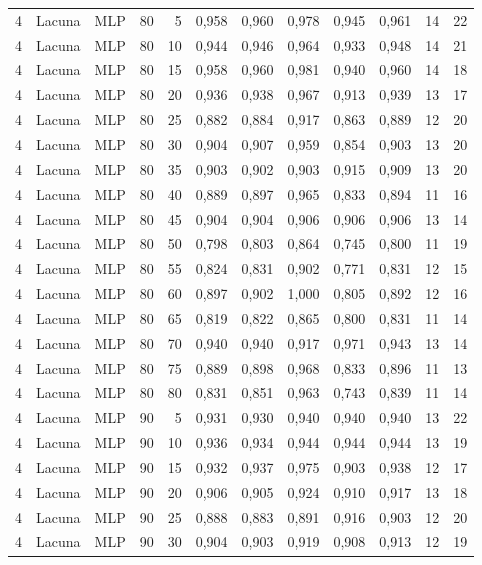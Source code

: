 \begin{longtable}{@{}rllrrrrrrrrr@{}}
4 & Lacuna & MLP & 80 & 5 & 0,958 & 0,960 & 0,978 & 0,945 & 0,961 & 14 & 22 \\
4 & Lacuna & MLP & 80 & 10 & 0,944 & 0,946 & 0,964 & 0,933 & 0,948 & 14 & 21 \\
4 & Lacuna & MLP & 80 & 15 & 0,958 & 0,960 & 0,981 & 0,940 & 0,960 & 14 & 18 \\
4 & Lacuna & MLP & 80 & 20 & 0,936 & 0,938 & 0,967 & 0,913 & 0,939 & 13 & 17 \\
4 & Lacuna & MLP & 80 & 25 & 0,882 & 0,884 & 0,917 & 0,863 & 0,889 & 12 & 20 \\
4 & Lacuna & MLP & 80 & 30 & 0,904 & 0,907 & 0,959 & 0,854 & 0,903 & 13 & 20 \\
4 & Lacuna & MLP & 80 & 35 & 0,903 & 0,902 & 0,903 & 0,915 & 0,909 & 13 & 20 \\
4 & Lacuna & MLP & 80 & 40 & 0,889 & 0,897 & 0,965 & 0,833 & 0,894 & 11 & 16 \\
4 & Lacuna & MLP & 80 & 45 & 0,904 & 0,904 & 0,906 & 0,906 & 0,906 & 13 & 14 \\
4 & Lacuna & MLP & 80 & 50 & 0,798 & 0,803 & 0,864 & 0,745 & 0,800 & 11 & 19 \\
4 & Lacuna & MLP & 80 & 55 & 0,824 & 0,831 & 0,902 & 0,771 & 0,831 & 12 & 15 \\
4 & Lacuna & MLP & 80 & 60 & 0,897 & 0,902 & 1,000 & 0,805 & 0,892 & 12 & 16 \\
4 & Lacuna & MLP & 80 & 65 & 0,819 & 0,822 & 0,865 & 0,800 & 0,831 & 11 & 14 \\
4 & Lacuna & MLP & 80 & 70 & 0,940 & 0,940 & 0,917 & 0,971 & 0,943 & 13 & 14 \\
4 & Lacuna & MLP & 80 & 75 & 0,889 & 0,898 & 0,968 & 0,833 & 0,896 & 11 & 13 \\
4 & Lacuna & MLP & 80 & 80 & 0,831 & 0,851 & 0,963 & 0,743 & 0,839 & 11 & 14 \\
4 & Lacuna & MLP & 90 & 5 & 0,931 & 0,930 & 0,940 & 0,940 & 0,940 & 13 & 22 \\
4 & Lacuna & MLP & 90 & 10 & 0,936 & 0,934 & 0,944 & 0,944 & 0,944 & 13 & 19 \\
4 & Lacuna & MLP & 90 & 15 & 0,932 & 0,937 & 0,975 & 0,903 & 0,938 & 12 & 17 \\
4 & Lacuna & MLP & 90 & 20 & 0,906 & 0,905 & 0,924 & 0,910 & 0,917 & 13 & 18 \\
4 & Lacuna & MLP & 90 & 25 & 0,888 & 0,883 & 0,891 & 0,916 & 0,903 & 12 & 20 \\
4 & Lacuna & MLP & 90 & 30 & 0,904 & 0,903 & 0,919 & 0,908 & 0,913 & 12 & 19 \\

\end{longtable}
